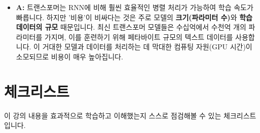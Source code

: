 \documentclass[11pt,a4paper]{article}
\begin{document}
\begin{itemize}
    \begin{itemize}
        \item \textbf{A:} 트랜스포머는 RNN에 비해 훨씬 효율적인 병렬 처리가 가능하여 학습 속도가 빠릅니다. 하지만 '비용'이 비싸다는 것은 주로 모델의 \textbf{크기(파라미터 수)}와 \textbf{학습 데이터의 규모} 때문입니다. 최신 트랜스포머 모델들은 수십억에서 수천억 개의 파라미터를 가지며, 이를 훈련하기 위해 페타바이트 규모의 텍스트 데이터를 사용합니다. 이 거대한 모델과 데이터를 처리하는 데 막대한 컴퓨팅 자원(GPU 시간)이 소모되므로 비용이 매우 높아집니다.
    \end{itemize}
\end{itemize}

\newpage
\section{체크리스트}
이 강의 내용을 효과적으로 학습하고 이해했는지 스스로 점검해볼 수 있는 체크리스트입니다.
\end{document}
